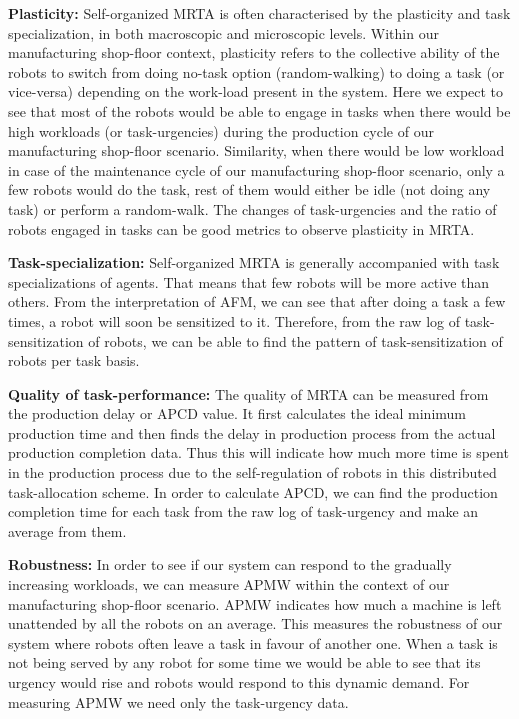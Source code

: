 \documentclass[smallcondensed]{svjour3}
\begin{document}
\textbf{Plasticity:} %
Self-organized MRTA is often characterised by the plasticity and task specialization, in both macroscopic and microscopic levels. Within our manufacturing shop-floor context, plasticity refers to the collective ability of the robots to switch from doing no-task option (random-walking) to doing a task (or vice-versa) depending on the work-load present in the system. Here we expect to see that most of the robots would be able to engage in tasks when there would be high workloads (or task-urgencies) during the production cycle of our manufacturing shop-floor scenario. Similarity, when there would be low workload in case of the maintenance cycle of our manufacturing shop-floor scenario, only a few robots would do the task, rest of them would either be idle (not doing any task) or perform a random-walk.  The changes of task-urgencies and the ratio of robots engaged in tasks can be good metrics to observe plasticity in MRTA.

\textbf{Task-specialization:} Self-organized MRTA is generally accompanied with task specializations of agents. That means that few robots will be more active than others. From the interpretation of AFM, we can see that after doing a task a few times, a robot will soon be sensitized to it. Therefore, from the raw log of task-sensitization of robots, we can be able to find the pattern of task-sensitization of robots per task basis.

\textbf{Quality of task-performance:} The quality of MRTA can be measured from the production delay or APCD value. It first calculates the ideal minimum production time and then finds the delay in production process from the actual production completion data. Thus this will indicate how much more time is  spent in the production process due to the self-regulation of robots in this distributed task-allocation scheme.  In order to calculate APCD, we can find the production completion time for each task from the raw log of task-urgency and make an average from them.

\textbf{Robustness:} In order to see if our system can respond to the gradually increasing workloads,  we can measure APMW within the context of our manufacturing shop-floor scenario. APMW indicates how much a machine is left unattended by all the robots on an average. This measures the robustness of our system where robots often leave a task in favour of another one. When a task is not being served by any robot for some time we would be able to see that its urgency would rise and robots would respond to this dynamic demand. For measuring APMW we need only the task-urgency data.
\end{document}
